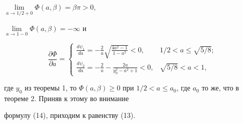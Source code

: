 \begin{pf}
$\lim\limits_{a\to1/2+0}\Phi(a,\beta)=\beta\pi>0$, 


$\lim\limits_{a\to1-0}\Phi(a,\beta)=-\infty$ и 


$$ 


\frac{\partial\Phi}{\partial a}= 


\begin{cases} 


\frac{d\psi_1}{d a}=-\frac{2}{a} 


\sqrt{\frac{4a^2-1}{1-a^2}}<0, & 1/2<a\le\sqrt{5/8};\\ 


\frac{d\psi_2}{d a}=-\frac{2}{a}-\frac{2a}{y^2_0-a^2+1}<0, 


& \sqrt{5/8}<a<1, 


\end{cases} 


$$ 


где $y_0$ из теоремы 1, то $\Phi(a,\beta)\ge0$ при $1/2<a\le 


a_0$, где $a_0$ то же, что в теореме 2. Приняв к этому во внимание 


формулу (14), приходим к равенству (13). 


\end{pf} 


 


